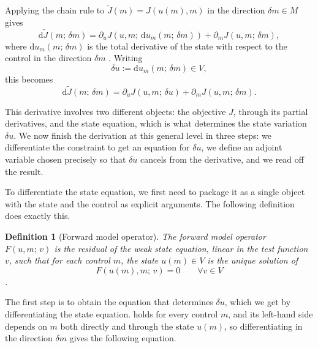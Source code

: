 \documentclass[a4paper,11pt]{article}
\newcommand{\Jt}{\tilde{J}}                  %
\newcommand{\Mspace}{M}
\theoremstyle{spacedplain} \newtheorem{theorem}[counter]{Theorem} \newtheorem{lemma}[counter]{Lemma} \newtheorem{prop}[counter]{Proposition} \newtheorem{cor}[counter]{Corollary}
\theoremstyle{spaceddefinition} \newtheorem{defn}[counter]{Definition} \newtheorem{example}[counter]{Example} \newtheorem{remark}[counter]{Remark}
\begin{document}
Applying the chain rule to $\Jt(m) = J(u(m), m)$ in the direction $\delta m \in \Mspace$ gives
\begin{equation}
  \label{eq:chain-rule-applied}
  \mathrm{d}\Jt(m;\, \delta m)
  = \partial_u J(u, m;\, \mathrm{d} u_m(m;\, \delta m))
  + \partial_m J(u, m;\, \delta m),
\end{equation}
where $\mathrm{d} u_m(m;\, \delta m)$ is the total derivative of the state with respect to the control in the direction $\delta m$ \citep[p.~32]{shfp2017}. Writing
\begin{equation}
  \delta u := \mathrm{d} u_m(m;\, \delta m) \in V,
\end{equation}
this becomes
\begin{equation}
  \label{eq:chain-rule-shorter}
  \mathrm{d}\Jt(m;\, \delta m)
  = \partial_u J(u, m;\, \delta u)
  + \partial_m J(u, m;\, \delta m).
\end{equation}

This derivative involves two different objects: the objective $J$, through its partial derivatives, and the state equation, which is what determines the state variation $\delta u$. We now finish the derivation at this general level in three steps: we differentiate the constraint to get an equation for $\delta u$, we define an adjoint variable chosen precisely so that $\delta u$ cancels from the derivative, and we read off the result.

To differentiate the state equation, we first need to package it as a single object with the state and the control as explicit arguments. The following definition does exactly this.

\begin{defn}[Forward model operator]
\label{defn:forward-operator}
The \emph{forward model operator} $F(u, m;\, v)$ is the residual of the weak state equation, linear in the test function $v$, such that for each control $m$, the state $u(m) \in V$ is the unique solution of
\begin{equation}
  \label{eq:state-general}
  F(u(m), m;\, v) = 0
  \qquad \forall v \in V
\end{equation}
\citep[p.~29]{shfp2017}.
\end{defn}

The first step is to obtain the equation that determines $\delta u$, which we get by differentiating the state equation.  holds for every control $m$, and its left-hand side depends on $m$ both directly and through the state $u(m)$, so differentiating in the direction $\delta m$ gives the following equation.
\end{document}
